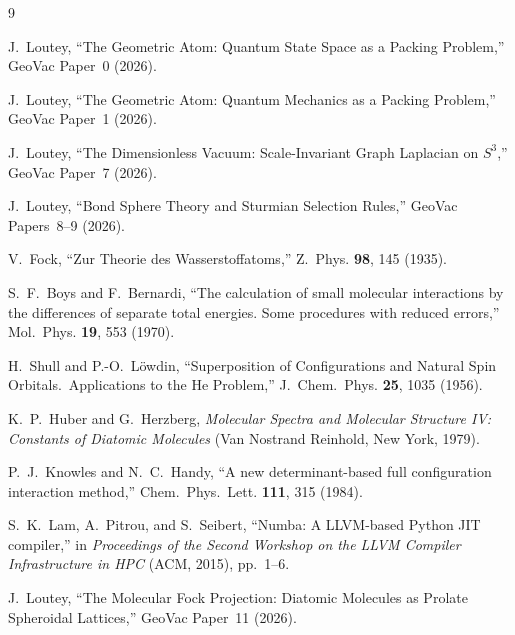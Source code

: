\documentclass[aps,pra,twocolumn,superscriptaddress,longbibliography]{revtex4-2}
\begin{document}
\begin{thebibliography}{9}

J.~Loutey, ``The Geometric Atom: Quantum State Space as a Packing Problem,''
GeoVac Paper~0 (2026).

J.~Loutey, ``The Geometric Atom: Quantum Mechanics as a Packing Problem,''
GeoVac Paper~1 (2026).

J.~Loutey, ``The Dimensionless Vacuum: Scale-Invariant Graph Laplacian
on $S^3$,'' GeoVac Paper~7 (2026).

J.~Loutey, ``Bond Sphere Theory and Sturmian Selection Rules,''
GeoVac Papers~8--9 (2026).

V.~Fock, ``Zur Theorie des Wasserstoffatoms,''
Z.~Phys. \textbf{98}, 145 (1935).

S.~F.~Boys and F.~Bernardi, ``The calculation of small molecular
interactions by the differences of separate total energies.  Some
procedures with reduced errors,''
Mol.~Phys. \textbf{19}, 553 (1970).

H.~Shull and P.-O.~L\"owdin, ``Superposition of Configurations and
Natural Spin Orbitals.\ Applications to the He Problem,''
J.~Chem.~Phys. \textbf{25}, 1035 (1956).

K.~P.~Huber and G.~Herzberg, \emph{Molecular Spectra and Molecular
Structure IV: Constants of Diatomic Molecules}
(Van Nostrand Reinhold, New York, 1979).

P.~J.~Knowles and N.~C.~Handy, ``A new determinant-based full
configuration interaction method,''
Chem.~Phys.~Lett. \textbf{111}, 315 (1984).

S.~K.~Lam, A.~Pitrou, and S.~Seibert, ``Numba: A LLVM-based Python
JIT compiler,'' in \emph{Proceedings of the Second Workshop on the LLVM
Compiler Infrastructure in HPC} (ACM, 2015), pp.~1--6.

J.~Loutey,
``The Molecular Fock Projection: Diatomic Molecules as Prolate
Spheroidal Lattices,''
GeoVac Paper~11 (2026).

\end{thebibliography}
\end{document}
